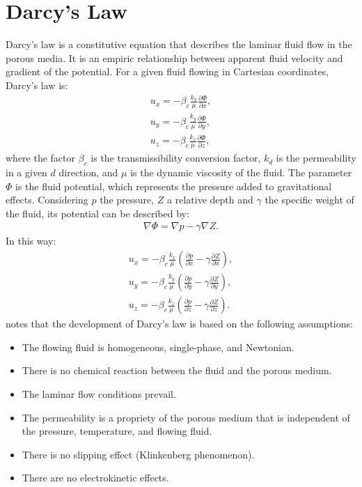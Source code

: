 \section{Darcy's Law}
Darcy's law is a constitutive equation that describes the laminar fluid flow in the porous media. It is an empiric relationship between apparent fluid velocity and gradient of the potential. For a given fluid flowing in Cartesian coordinates, Darcy's law is:
	\begin{align}
	\label{eq:9} \nonumber
	u_x=-\beta_c\frac{k_x}{\mu}\frac{\partial \Phi}{\partial x}, \\ \nonumber
	u_y=-\beta_c\frac{k_y}{\mu}\frac{\partial \Phi}{\partial y}, \\
	u_z=-\beta_c\frac{k_z}{\mu}\frac{\partial \Phi}{\partial z},
	\end{align}
where the factor $\beta_c$ is the transmissibility conversion factor, $k_d$ is the permeability in a given $d$ direction, and $\mu$ is the dynamic viscosity of the fluid. The parameter $\Phi$ is the fluid potential, which represents the pressure added to gravitational effects. Considering $p$ the pressure, $Z$ a relative depth and $\gamma$ the specific weight of the fluid, its potential can be described by:
	\begin{align}
	\label{eq:10}
	\nabla \Phi=\nabla p - \gamma \nabla Z.
	\end{align}
In this way:
	\begin{align}
	\label{eq:11} \nonumber
	u_x=-\beta_c\frac{k_x}{\mu}(\frac{\partial p}{\partial x} - \gamma \frac{\partial Z}{\partial x}), \\ \nonumber
	u_y=-\beta_c\frac{k_y}{\mu}(\frac{\partial p}{\partial y} - \gamma \frac{\partial Z}{\partial y}), \\
	u_z=-\beta_c\frac{k_z}{\mu}(\frac{\partial p}{\partial z} - \gamma \frac{\partial Z}{\partial z}).
	\end{align}
\cite{Ertekin2001} notes that the development of Darcy's law is based on the following assumptions:
\begin{itemize}
	\item The flowing fluid is homogeneous, single-phase, and Newtonian.
	\item There is no chemical reaction between the fluid and the porous medium.
	\item The laminar flow conditions prevail.
	\item The permeability is a propriety of the porous medium that is independent of the pressure, temperature, and flowing fluid.
	\item There is no slipping effect (Klinkenberg phenomenon).
	\item There are no electrokinetic effects.
	\end{itemize}

